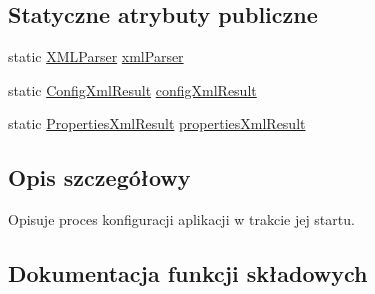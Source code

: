 \subsection*{Statyczne atrybuty publiczne}
\begin{DoxyCompactItemize}
\item 
static \hyperlink{classpl_1_1edu_1_1uwb_1_1mobiuwb_1_1parsers_1_1xml_1_1parser_1_1_x_m_l_parser}{X\+M\+L\+Parser} \hyperlink{classpl_1_1edu_1_1uwb_1_1mobiuwb_1_1configuration_1_1_startup_config_a015db43e9326c413b6caf4ed155fdf28}{xml\+Parser}
\item 
static \hyperlink{classpl_1_1edu_1_1uwb_1_1mobiuwb_1_1parsers_1_1xml_1_1parser_1_1_config_xml_result}{Config\+Xml\+Result} \hyperlink{classpl_1_1edu_1_1uwb_1_1mobiuwb_1_1configuration_1_1_startup_config_a553d895b6e31e82dcd05ab6a4b6a0b1c}{config\+Xml\+Result}
\item 
static \hyperlink{classpl_1_1edu_1_1uwb_1_1mobiuwb_1_1parsers_1_1xml_1_1parser_1_1result_1_1model_1_1_properties_xml_result}{Properties\+Xml\+Result} \hyperlink{classpl_1_1edu_1_1uwb_1_1mobiuwb_1_1configuration_1_1_startup_config_a320814a7c5ad1d065922dec45ea1e2ea}{properties\+Xml\+Result}
\end{DoxyCompactItemize}


\subsection{Opis szczegółowy}
Opisuje proces konfiguracji aplikacji w trakcie jej startu. 

\subsection{Dokumentacja funkcji składowych}
\hypertarget{classpl_1_1edu_1_1uwb_1_1mobiuwb_1_1configuration_1_1_startup_config_add0beb9b56bba873f8a6e2e2b63c7a31}{}
